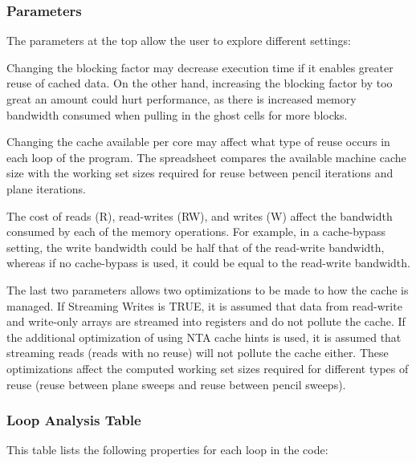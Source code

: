 \subsubsection{Parameters}

The parameters at the top allow the user to explore different settings:

Changing the blocking factor may decrease execution time if it enables
greater reuse of cached data.  On the other hand, increasing the
blocking factor by too great an amount could hurt performance, as there
is increased memory bandwidth consumed when pulling in the ghost cells
for more blocks.

Changing the cache available per core may affect what type of reuse
occurs in each loop of the program.  The spreadsheet compares the
available machine cache size with the working set sizes required for
reuse between pencil iterations and plane iterations.

The cost of reads (R), read-writes (RW), and writes (W) affect the
bandwidth consumed by each of the memory operations.  For example, in
a cache-bypass setting, the write bandwidth could be half that of the
read-write bandwidth, whereas if no cache-bypass is used, it could be
equal to the read-write bandwidth.

The last two parameters allows two optimizations to be made to how the
cache is managed.  If Streaming Writes is TRUE, it is assumed that data
from read-write and write-only arrays are streamed into registers and
do not pollute the cache.  If the additional optimization of using NTA
cache hints is used, it is assumed that streaming reads (reads with no
reuse) will not pollute the cache either.  These optimizations affect
the computed working set sizes required for different types of reuse
(reuse between plane sweeps and reuse between pencil sweeps).

\subsubsection{Loop Analysis Table}

This table lists the following properties for each loop in the code:

